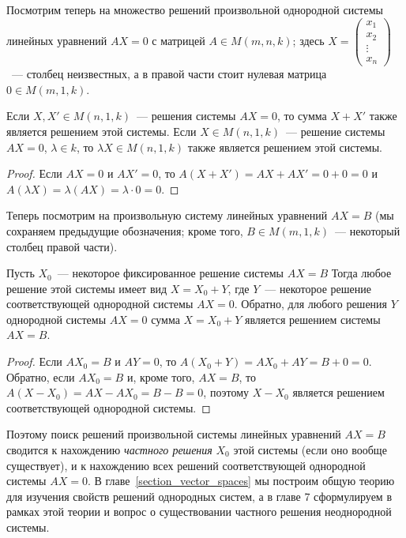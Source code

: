 Посмотрим теперь на множество решений произвольной однородной системы
линейных уравнений $AX=0$ с матрицей $A\in M(m,n,k)$; здесь
$X=\begin{pmatrix}x_1\\x_2\\\vdots\\x_n\end{pmatrix}$~--- столбец
неизвестных, а в правой части стоит нулевая матрица $0\in M(m,1,k)$.

\begin{proposition}
Если $X, X'\in M(n,1,k)$~--- решения системы $AX=0$, то сумма
  $X+X'$ также является решением этой системы.
Если $X\in M(n,1,k)$~--- решение системы $AX=0$, $\lambda\in k$,
  то $\lambda X\in M(n,1,k)$ также является решением этой системы.
\end{proposition}
\begin{proof}
Если $AX=0$ и $AX'=0$, то $A(X+X')=AX+AX'=0+0=0$ и
$A(\lambda X)=\lambda(AX)=\lambda\cdot 0=0$.
\end{proof}

Теперь посмотрим на произвольную систему линейных уравнений $AX=B$
(мы сохраняем предыдущие обозначения; кроме того, $B\in M(m,1,k)$~---
некоторый столбец правой части).
\begin{proposition}\label{prop_structure_of_solutions_linear_system}
Пусть $X_0$~--- некоторое фиксированное решение системы $AX=B$
Тогда любое решение этой системы
имеет вид $X = X_0 + Y$, где $Y$~--- некоторое решение соответствующей
однородной системы $AX=0$. Обратно, для любого решения $Y$ однородной
системы $AX=0$ сумма $X = X_0+Y$ является решением системы $AX=B$.
\end{proposition}
\begin{proof}
Если $AX_0=B$ и $AY=0$, то $A(X_0+Y)=AX_0+AY=B+0=0$. Обратно, если
$AX_0=B$ и, кроме того, $AX=B$, то $A(X-X_0)=AX-AX_0=B-B=0$, поэтому
$X-X_0$ является решением соответствующей однородной системы.
\end{proof}

Поэтому поиск решений произвольной системы линейных уравнений $AX=B$
сводится к нахождению {\em частного решения} $X_0$ этой системы (если
оно вообще существует), и к
нахождению всех решений соответствующей однородной системы $AX=0$.
В главе~\ref{section_vector_spaces} мы построим общую теорию для
изучения свойств решений однородных систем, а в главе 7 сформулируем
в рамках этой теории и вопрос о существовании частного решения
неоднородной
системы.
